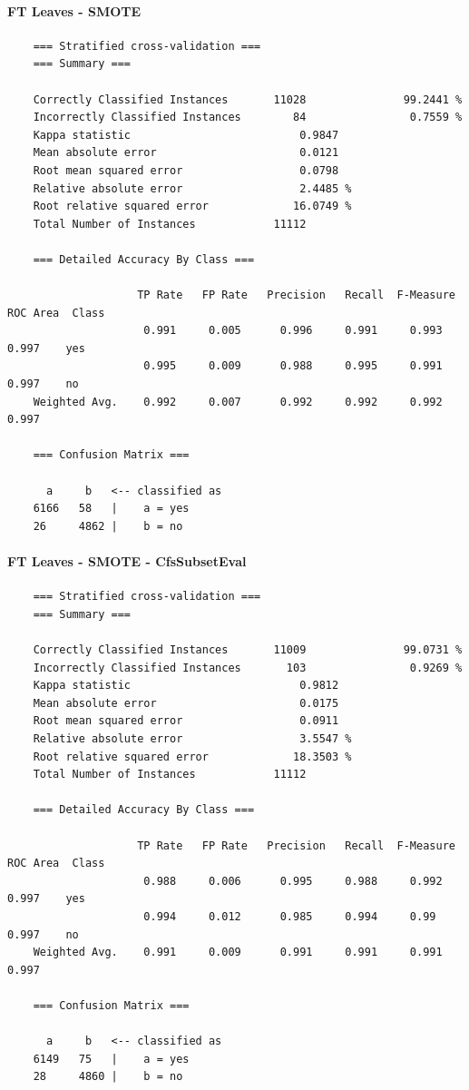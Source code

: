 \paragraph{FT Leaves - SMOTE}
{\footnotesize
	\begin{verbatim}
	=== Stratified cross-validation ===
	=== Summary ===
	
	Correctly Classified Instances       11028               99.2441 %
	Incorrectly Classified Instances        84                0.7559 %
	Kappa statistic                          0.9847
	Mean absolute error                      0.0121
	Root mean squared error                  0.0798
	Relative absolute error                  2.4485 %
	Root relative squared error             16.0749 %
	Total Number of Instances            11112     
	
	=== Detailed Accuracy By Class ===
	
	                TP Rate   FP Rate   Precision   Recall  F-Measure   ROC Area  Class
	                 0.991     0.005      0.996     0.991     0.993      0.997    yes
	                 0.995     0.009      0.988     0.995     0.991      0.997    no
	Weighted Avg.    0.992     0.007      0.992     0.992     0.992      0.997
	
	=== Confusion Matrix ===
	
	  a     b   <-- classified as
	6166   58   |    a = yes
	26     4862 |    b = no
	\end{verbatim}
}
\paragraph{FT Leaves - SMOTE - CfsSubsetEval}
{\footnotesize
	\begin{verbatim}
	=== Stratified cross-validation ===
	=== Summary ===
	
	Correctly Classified Instances       11009               99.0731 %
	Incorrectly Classified Instances       103                0.9269 %
	Kappa statistic                          0.9812
	Mean absolute error                      0.0175
	Root mean squared error                  0.0911
	Relative absolute error                  3.5547 %
	Root relative squared error             18.3503 %
	Total Number of Instances            11112     
	
	=== Detailed Accuracy By Class ===
	
	                TP Rate   FP Rate   Precision   Recall  F-Measure   ROC Area  Class
	                 0.988     0.006      0.995     0.988     0.992      0.997    yes
	                 0.994     0.012      0.985     0.994     0.99       0.997    no
	Weighted Avg.    0.991     0.009      0.991     0.991     0.991      0.997
	
	=== Confusion Matrix ===
	
	  a     b   <-- classified as
	6149   75   |    a = yes
	28     4860 |    b = no	
	\end{verbatim}
}

